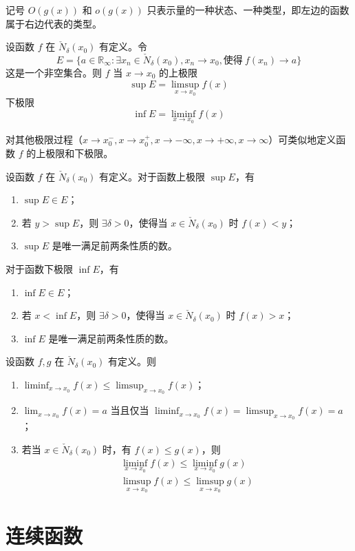 \begin{remark}
    记号 $O(g(x))$ 和 $o(g(x))$ 只表示量的一种状态、一种类型，即左边的函数属于右边代表的类型。
\end{remark}

\begin{definition}
    设函数 $f$ 在 $\check{N}_{\delta}(x_0)$ 有定义。令
    \[E = \{ a \in \mathbb{R}_{\infty}: \exists x_n \in \check{N}_{\delta}(x_0), x_n \to x_0, \text{使得}\ f(x_n) \to a\}\]
    这是一个非空集合。则 $f$ 当 $x \to x_0$ 的上极限
    \[\sup E = \limsup_{x \to x_0}f(x)\]
    下极限
    \[\inf E = \liminf_{x \to x_0}f(x)\]
\end{definition}

\begin{remark}
    对其他极限过程（$x \to x_{0}^{-}, x \to x_{0}^{+}, x \to -\infty, x \to +\infty, x \to \infty$）可类似地定义函数 $f$ 的上极限和下极限。
\end{remark}

\begin{theorem}
    设函数 $f$ 在 $\check{N}_{\delta}(x_0)$ 有定义。对于函数上极限 $\sup E$，有
    \begin{enumerate}
        \item $\sup E \in E$；
        \item 若 $y > \sup E$，则 $\exists \delta > 0$，使得当 $x \in \check{N}_{\delta}(x_0)$ 时 $f(x) < y$；
        \item $\sup E$ 是唯一满足前两条性质的数。
    \end{enumerate}
    对于函数下极限 $\inf E$，有
    \begin{enumerate}
        \item $\inf E \in E$；
        \item 若 $x < \inf E$，则 $\exists \delta > 0$，使得当 $x \in \check{N}_{\delta}(x_0)$ 时 $f(x) > x$；
        \item $\inf E$ 是唯一满足前两条性质的数。
    \end{enumerate}
\end{theorem}

\begin{theorem}
    设函数 $f, g$ 在 $\check{N}_{\delta}(x_0)$ 有定义。则
    \begin{enumerate}[itemsep=0.5em]
        \item $\displaystyle \liminf_{x \to x_0}f(x) \leqslant \limsup_{x \to x_0}f(x)$；
        \item $\displaystyle \lim_{x \to x_0}f(x) = a$ 当且仅当 $\displaystyle \liminf_{x \to x_0}f(x) = \limsup_{x \to x_0}f(x) = a$；
        \item 若当 $x \in \check{N}_{\delta}(x_0)$ 时，有 $f(x) \leqslant g(x)$，则
              \begin{gather*}
                  \liminf_{x \to x_0}f(x) \leqslant \liminf_{x \to x_0}g(x) \\
                  \limsup_{x \to x_0}f(x) \leqslant \limsup_{x \to x_0}g(x)
              \end{gather*}
    \end{enumerate}
\end{theorem}


\section{连续函数}






